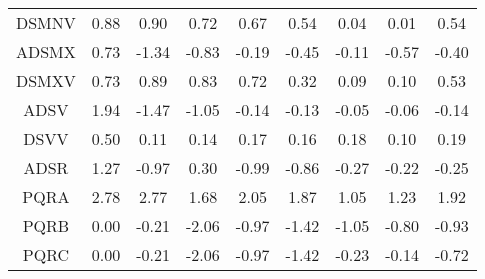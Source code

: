 \documentclass[11pt,a4paper]{report}
\begin{document}
\begin{longtable}{ | c || c | c | c | c | c | c | c || c |}
DSMNV &  \cellcolor[HTML]{E7E7FF} 0.88 &  \cellcolor[HTML]{E7E7FF} 0.90 &  \cellcolor[HTML]{EFEFFF} 0.72 &  \cellcolor[HTML]{EFEFFF} 0.67 &  \cellcolor[HTML]{EFEFFF} 0.54 &  \cellcolor[HTML]{FFFFFF} 0.04 &  \cellcolor[HTML]{FFFFFF} 0.01 &  \cellcolor[HTML]{EFEFFF} 0.54 \\
ADSMX &  \cellcolor[HTML]{EFEFFF} 0.73 &  \cellcolor[HTML]{FFDFDF} -1.34 &  \cellcolor[HTML]{FFE7E7} -0.83 &  \cellcolor[HTML]{FFF7F7} -0.19 &  \cellcolor[HTML]{FFF7F7} -0.45 &  \cellcolor[HTML]{FFFFFF} -0.11 &  \cellcolor[HTML]{FFEFEF} -0.57 &  \cellcolor[HTML]{FFF7F7} -0.40 \\
DSMXV &  \cellcolor[HTML]{EFEFFF} 0.73 &  \cellcolor[HTML]{E7E7FF} 0.89 &  \cellcolor[HTML]{E7E7FF} 0.83 &  \cellcolor[HTML]{EFEFFF} 0.72 &  \cellcolor[HTML]{F7F7FF} 0.32 &  \cellcolor[HTML]{FFFFFF} 0.09 &  \cellcolor[HTML]{FFFFFF} 0.10 &  \cellcolor[HTML]{EFEFFF} 0.53 \\
ADSV &  \cellcolor[HTML]{CFCFFF} 1.94 &  \cellcolor[HTML]{FFD7D7} -1.47 &  \cellcolor[HTML]{FFE7E7} -1.05 &  \cellcolor[HTML]{FFFFFF} -0.14 &  \cellcolor[HTML]{FFFFFF} -0.13 &  \cellcolor[HTML]{FFFFFF} -0.05 &  \cellcolor[HTML]{FFFFFF} -0.06 &  \cellcolor[HTML]{FFFFFF} -0.14 \\
DSVV &  \cellcolor[HTML]{EFEFFF} 0.50 &  \cellcolor[HTML]{FFFFFF} 0.11 &  \cellcolor[HTML]{FFFFFF} 0.14 &  \cellcolor[HTML]{F7F7FF} 0.17 &  \cellcolor[HTML]{F7F7FF} 0.16 &  \cellcolor[HTML]{F7F7FF} 0.18 &  \cellcolor[HTML]{FFFFFF} 0.10 &  \cellcolor[HTML]{F7F7FF} 0.19 \\
ADSR &  \cellcolor[HTML]{DFDFFF} 1.27 &  \cellcolor[HTML]{FFE7E7} -0.97 &  \cellcolor[HTML]{F7F7FF} 0.30 &  \cellcolor[HTML]{FFE7E7} -0.99 &  \cellcolor[HTML]{FFE7E7} -0.86 &  \cellcolor[HTML]{FFF7F7} -0.27 &  \cellcolor[HTML]{FFF7F7} -0.22 &  \cellcolor[HTML]{FFF7F7} -0.25 \\
PQRA &  \cellcolor[HTML]{B7B7FF} 2.78 &  \cellcolor[HTML]{B7B7FF} 2.77 &  \cellcolor[HTML]{D7D7FF} 1.68 &  \cellcolor[HTML]{CFCFFF} 2.05 &  \cellcolor[HTML]{CFCFFF} 1.87 &  \cellcolor[HTML]{E7E7FF} 1.05 &  \cellcolor[HTML]{DFDFFF} 1.23 &  \cellcolor[HTML]{CFCFFF} 1.92 \\
PQRB &  \cellcolor[HTML]{FFFFFF} 0.00 &  \cellcolor[HTML]{FFF7F7} -0.21 &  \cellcolor[HTML]{FFCFCF} -2.06 &  \cellcolor[HTML]{FFE7E7} -0.97 &  \cellcolor[HTML]{FFDFDF} -1.42 &  \cellcolor[HTML]{FFE7E7} -1.05 &  \cellcolor[HTML]{FFE7E7} -0.80 &  \cellcolor[HTML]{FFE7E7} -0.93 \\
PQRC &  \cellcolor[HTML]{FFFFFF} 0.00 &  \cellcolor[HTML]{FFF7F7} -0.21 &  \cellcolor[HTML]{FFCFCF} -2.06 &  \cellcolor[HTML]{FFE7E7} -0.97 &  \cellcolor[HTML]{FFDFDF} -1.42 &  \cellcolor[HTML]{FFF7F7} -0.23 &  \cellcolor[HTML]{FFFFFF} -0.14 &  \cellcolor[HTML]{FFEFEF} -0.72 \\

\end{longtable}
\end{document}
